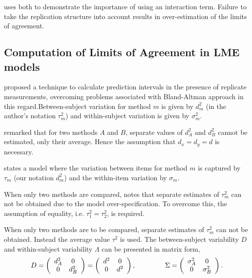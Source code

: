 \documentclass[12pt, a4paper]{report}
\theoremstyle{plain}
\theoremstyle{definition}
\theoremstyle{remark}
\begin{document}
	\citet{BXC2008} uses both to demonstrate the importance of using an interaction term. Failure to take the replication structure into account results in over-estimation of the limits of agreement.
	
	
	
	
	
	\subsection{Computation of Limits of Agreement in LME models}
	
	
	\citet{BXC2008} proposed a technique to calculate prediction intervals in the presence of replicate measurements, overcoming problems associated with Bland-Altman approach in this regard.Between-subject variation for method $m$ is given by $d^2_{m}$ (in the author's notation $\tau^2_m$) and within-subject variation is given by $\sigma^2_{m}$.  
	
	\citet{BXC2008} remarked that for two methods $A$ and $B$, separate values of $d^2_{A}$ and $d^2_{B}$ cannot be estimated, only their average. Hence the assumption that $d_{x}= d_{y}= d$ is necessary. %
	
	\citet{BXC2008} states a model where the variation between items for method $m$ is captured by $\tau_m$ (our notation $d^2_m$) and the within-item variation by $\sigma_m$.
	
	
	When only two methods are compared, \citet{BXC2008} notes that separate estimates of $\tau^2_m$ can not be obtained due to the model over-specification. To overcome this, the assumption of equality, i.e. $\tau^2_1 = \tau^2_2$, is required.
	
	When only two methods are to be compared, separate estimates of $\tau^2_m$ can not be obtained. Instead the average value $\tau^2$ is used. The between-subject variability ${D}$ and within-subject variability ${\Lambda}$ can be presented in matrix form,\[
	{D} = \left(%
	\begin{array}{cc}
	d^2_{A}& 0 \\
	0 & d^2_{B} \\
	\end{array}%
	\right)=\left(%
	\begin{array}{cc}
	d^2& 0 \\
	0 & d^2\\
	\end{array}%
	\right),
	\hspace{1.5cm}
	{\Sigma} = \left(%
	\begin{array}{cc}
	\sigma^2_{A}& 0 \\
	0 & \sigma^2_{B} \\
	\end{array}%
	\right).
	\]
	
\end{document}

